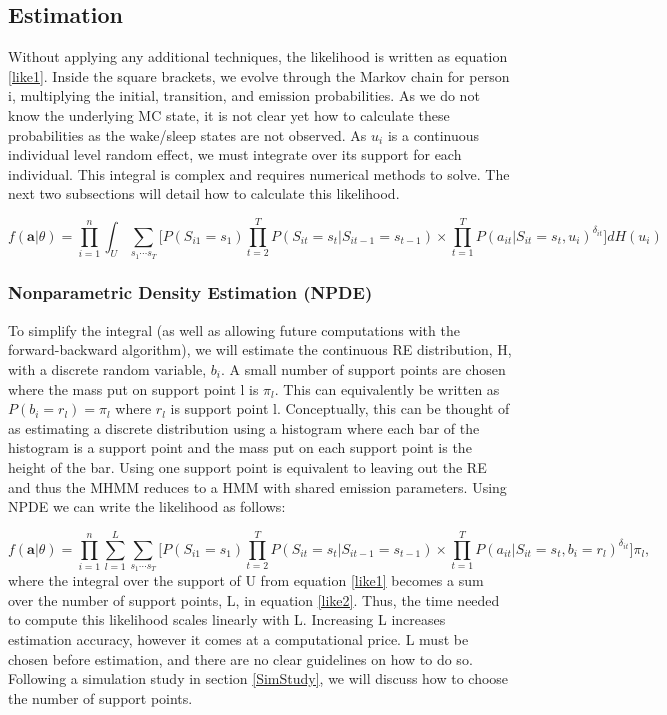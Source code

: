 \documentclass{article}
\begin{document}
\subsection{Estimation}

Without applying any additional techniques, the likelihood is written as equation \ref{like1}. Inside the square brackets, we evolve through the Markov chain for person i, multiplying the initial, transition, and emission probabilities. As we do not know the underlying MC state, it is not clear yet how to calculate these probabilities as the wake/sleep states are not observed. As $u_i$ is a continuous individual level random effect, we must integrate over its support for each individual. This integral is complex and requires numerical methods to solve. The next two subsections will detail how to calculate this likelihood. 

\begin{equation}\label{like1}
f(\textbf{a}|\theta) = \prod_{i=1}^n \int_U \sum_{{s_1}\cdots{s_T}} \biggr[ 
    P(S_{i1}=s_1)\prod_{t=2}^T P(S_{it}=s_t|S_{it-1}=s_{t-1}) \times 
    \prod_{t=1}^T P(a_{it}|S_{it}=s_t,u_i)^{\delta_{it}} \biggr] dH(u_i)
\end{equation}

\subsubsection{Nonparametric Density Estimation (NPDE)}

To simplify the integral (as well as allowing future computations with the forward-backward algorithm), we will estimate the continuous RE distribution, H, with a discrete random variable, $b_i$. A small number of support points are chosen where the mass put on support point l is $\pi_l$. This can equivalently be written as $P(b_i = r_l) = \pi_l$ where $r_l$ is support point l. Conceptually, this can be thought of as estimating a discrete distribution using a histogram where each bar of the histogram is a support point and the mass put on each support point is the height of the bar. Using one support point is equivalent to leaving out the RE and thus the MHMM reduces to a HMM with shared emission parameters. Using NPDE we can write the likelihood as follows: 

\begin{equation}\label{like2}
f(\textbf{a}|\theta) = \prod_{i=1}^n \sum_{l=1}^L \sum_{{s_1}\cdots{s_T}} \biggr[ 
    P(S_{i1}=s_1)\prod_{t=2}^T P(S_{it}=s_t|S_{it-1}=s_{t-1}) \times 
    \prod_{t=1}^T P(a_{it}|S_{it}=s_t,b_i=r_l)^{\delta_{it}} \biggr] \pi_l,
\end{equation}
where the integral over the support of U from equation \ref{like1} becomes a sum over the number of support points, L, in equation \ref{like2}. Thus, the time needed to compute this likelihood scales linearly with L. Increasing L increases estimation accuracy, however it comes at a computational price. L must be chosen before estimation, and there are no clear guidelines on how to do so. Following a simulation study in section \ref{SimStudy}, we will discuss how to choose the number of support points.
\end{document}
